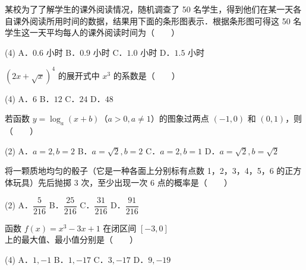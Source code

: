 \begin{question}
某校为了了解学生的课外阅读情况，随机调查了 50 名学生，得到他们在某一天各自课外阅读所用时间的数据，结果用下面的条形图表示．根据条形图可得这 50 名学生这一天平均每人的课外阅读时间为\mbox{（　　）}
\nopagebreak[4]
\begin{center}\end{center}
\nopagebreak[4]
\begin{gkopts}(4)
\task A．$0.6$ 小时
\task B．$0.9$ 小时
\task C．$1.0$ 小时
\task D．$1.5$ 小时
\end{gkopts}

\end{question}
\begin{question}
$(2x + \sqrt{x})^4$ 的展开式中 $x^3$ 的系数是\mbox{（　　）}

\begin{gkopts}(4)
\task A．$6$
\task B．$12$
\task C．$24$
\task D．$48$
\end{gkopts}

\end{question}
\begin{question}
若函数 $y = \log_a(x + b)$（$a > 0, a \neq 1$）的图象过两点 $(-1, 0)$ 和 $(0, 1)$，则\mbox{（　　）}

\begin{gkopts}(2)
\task A．$a = 2, b = 2$
\task B．$a = \sqrt{2}, b = 2$
\task C．$a = 2, b = 1$
\task D．$a = \sqrt{2}, b = \sqrt{2}$
\end{gkopts}

\end{question}
\begin{question}
将一颗质地均匀的骰子（它是一种各面上分别标有点数 1，2，3，4，5，6 的正方体玩具）先后抛掷 3 次，至少出现一次 6 点的概率是\mbox{（　　）}

\begin{gkopts}(2)
\task A．$\dfrac{5}{216}$
\task B．$\dfrac{25}{216}$
\task C．$\dfrac{31}{216}$
\task D．$\dfrac{91}{216}$
\end{gkopts}

\end{question}
\begin{question}
函数 $f(x) = x^3 - 3x + 1$ 在闭区间 $[-3, 0]$ 上的最大值、最小值分别是\mbox{（　　）}

\begin{gkopts}(4)
\task A．$1, -1$
\task B．$1, -17$
\task C．$3, -17$
\task D．$9, -19$
\end{gkopts}

\end{question}
